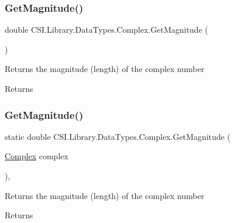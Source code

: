 \subsubsection{\texorpdfstring{GetMagnitude()}{GetMagnitude()}\hspace{0.1cm}{\footnotesize\ttfamily [1/2]}}
{\footnotesize\ttfamily double C\+S\+I.\+Library.\+Data\+Types.\+Complex.\+Get\+Magnitude (\begin{DoxyParamCaption}{ }\end{DoxyParamCaption})\hspace{0.3cm}{\ttfamily [inline]}}



Returns the magnitude (length) of the complex number 

\begin{DoxyReturn}{Returns}

\end{DoxyReturn}
\mbox{\label{struct_c_s_i_1_1_library_1_1_data_types_1_1_complex_a55d1594b34a93a2f0a1c676085a177f9}} 
\subsubsection{\texorpdfstring{GetMagnitude()}{GetMagnitude()}\hspace{0.1cm}{\footnotesize\ttfamily [2/2]}}
{\footnotesize\ttfamily static double C\+S\+I.\+Library.\+Data\+Types.\+Complex.\+Get\+Magnitude (\begin{DoxyParamCaption}\item[{\mbox{\hyperlink{struct_c_s_i_1_1_library_1_1_data_types_1_1_complex}{Complex}}}]{complex }\end{DoxyParamCaption})\hspace{0.3cm}{\ttfamily [inline]}, {\ttfamily [static]}}



Returns the magnitude (length) of the complex number 

\begin{DoxyReturn}{Returns}

\end{DoxyReturn}
\mbox{\label{struct_c_s_i_1_1_library_1_1_data_types_1_1_complex_a829d8f3ada314bb10f43c3cc1365bb59}} 
